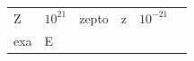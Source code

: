 {\begin{tabular}[t]{|l|l|l|l|l|l|}
        Z &
    
    
        
                \begin{math}{10}^{21}\end{math}
               &
    
    
        zepto &
    
    
        z &
    
    
        
                \begin{math}{10}^{-21}\end{math}
     \tabularnewline\cline{1-1}\cline{2-2}\cline{3-3}\cline{4-4}\cline{5-5}\cline{6-6}
    
    
        exa &
    
    
        E &
    
    
        

\end{tabular}}
